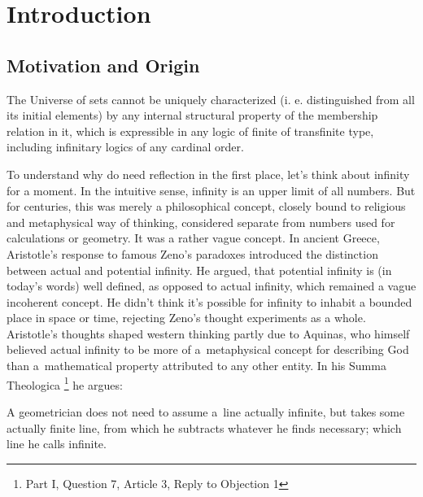 \documentclass[12pt,a4paper]{article}
\begin{document}
\tableofcontents
\clearpage


\pagestyle{fancy} %
\renewcommand{\sectionmark}[1]{\markboth{\slshape\thesection.\ #1}{}}


\section{Introduction}\label{sec:introduction}

\subsection{Motivation and Origin}
\begin{displayquote}
The Universe of sets cannot be uniquely characterized (i. e. distinguished from all its initial elements) by any internal structural property of the membership relation in it, which is expressible in any logic of finite of transfinite type, including infinitary logics of any cardinal order.
\end{displayquote}

To understand why do need reflection in the first place, let's think about infinity for a moment. In the intuitive sense, infinity is an upper limit of all numbers. But for centuries, this was merely a philosophical concept, closely bound to religious and metaphysical way of thinking, 
considered separate from numbers used for calculations or geometry. It was a rather vague concept. 
In ancient Greece, Aristotle's response to famous Zeno's paradoxes introduced the distinction between actual and potential infinity.
He argued, that potential infinity is (in today's words) well defined, as opposed to actual infinity, which remained a vague incoherent concept. He didn't think it's possible for infinity to inhabit a bounded place in space or time, rejecting Zeno's thought experiments as a whole. 
Aristotle's thoughts shaped western thinking partly due to Aquinas, who himself believed actual infinity to be more of a~metaphysical concept for describing God than a~mathematical property attributed to any other entity. In his Summa Theologica \footnote{Part I, Question 7, Article 3, Reply to Objection 1} he argues:
\begin{displayquote}
A geometrician does not need to assume a~line actually infinite, but takes some actually finite line, from which he subtracts whatever he finds necessary; which line he calls infinite.
\end{displayquote} %
\end{document}
